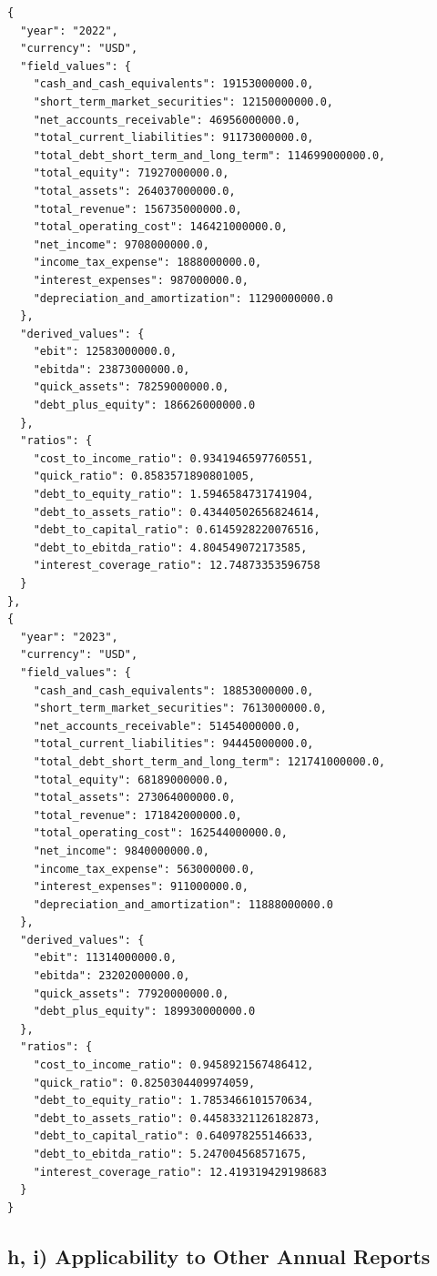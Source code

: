 \documentclass[12pt,a4paper]{article}
\begin{document}
\begin{lstlisting}[style=json, caption={Calculated financial ratios for GM (FY\,2022--2023)}, label=lst:ratios_gm]
{
  "year": "2022",
  "currency": "USD",
  "field_values": {
    "cash_and_cash_equivalents": 19153000000.0,
    "short_term_market_securities": 12150000000.0,
    "net_accounts_receivable": 46956000000.0,
    "total_current_liabilities": 91173000000.0,
    "total_debt_short_term_and_long_term": 114699000000.0,
    "total_equity": 71927000000.0,
    "total_assets": 264037000000.0,
    "total_revenue": 156735000000.0,
    "total_operating_cost": 146421000000.0,
    "net_income": 9708000000.0,
    "income_tax_expense": 1888000000.0,
    "interest_expenses": 987000000.0,
    "depreciation_and_amortization": 11290000000.0
  },
  "derived_values": {
    "ebit": 12583000000.0,
    "ebitda": 23873000000.0,
    "quick_assets": 78259000000.0,
    "debt_plus_equity": 186626000000.0
  },
  "ratios": {
    "cost_to_income_ratio": 0.9341946597760551,
    "quick_ratio": 0.8583571890801005,
    "debt_to_equity_ratio": 1.5946584731741904,
    "debt_to_assets_ratio": 0.43440502656824614,
    "debt_to_capital_ratio": 0.6145928220076516,
    "debt_to_ebitda_ratio": 4.804549072173585,
    "interest_coverage_ratio": 12.74873353596758
  }
},
{
  "year": "2023",
  "currency": "USD",
  "field_values": {
    "cash_and_cash_equivalents": 18853000000.0,
    "short_term_market_securities": 7613000000.0,
    "net_accounts_receivable": 51454000000.0,
    "total_current_liabilities": 94445000000.0,
    "total_debt_short_term_and_long_term": 121741000000.0,
    "total_equity": 68189000000.0,
    "total_assets": 273064000000.0,
    "total_revenue": 171842000000.0,
    "total_operating_cost": 162544000000.0,
    "net_income": 9840000000.0,
    "income_tax_expense": 563000000.0,
    "interest_expenses": 911000000.0,
    "depreciation_and_amortization": 11888000000.0
  },
  "derived_values": {
    "ebit": 11314000000.0,
    "ebitda": 23202000000.0,
    "quick_assets": 77920000000.0,
    "debt_plus_equity": 189930000000.0
  },
  "ratios": {
    "cost_to_income_ratio": 0.9458921567486412,
    "quick_ratio": 0.8250304409974059,
    "debt_to_equity_ratio": 1.7853466101570634,
    "debt_to_assets_ratio": 0.44583321126182873,
    "debt_to_capital_ratio": 0.640978255146633,
    "debt_to_ebitda_ratio": 5.247004568571675,
    "interest_coverage_ratio": 12.419319429198683
  }
}
\end{lstlisting}

\subsection{h, i) Applicability to Other Annual Reports}
\end{document}
